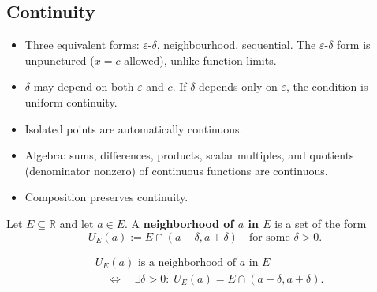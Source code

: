 
\subsection{Continuity}
\label{sec:continuity}


\begin{tcolorbox}[title={Toolkit --- Continuity}]
\begin{itemize}
  \item Three equivalent forms: $\varepsilon$-$\delta$, neighbourhood,
    sequential. The $\varepsilon$-$\delta$ form is unpunctured
    ($x=c$ allowed), unlike function limits.
  \item $\delta$ may depend on both $\varepsilon$ and $c$.
    If $\delta$ depends only on $\varepsilon$, the condition is
    uniform continuity.
  \item Isolated points are automatically continuous.
  \item Algebra: sums, differences, products, scalar multiples,
    and quotients (denominator nonzero) of continuous functions
    are continuous.
  \item Composition preserves continuity.
\end{itemize}
\end{tcolorbox}


\begin{tcolorbox}[title={Definition --- Relative Neighborhood}]
\begin{definition}
\label{def:relative-neighborhood}
Let $E \subseteq \mathbb{R}$ and let $a \in E$. A
\textbf{neighborhood of $a$ in $E$} is a set of the form
\[
U_E(a) := E \cap (a-\delta, a+\delta)
\quad \text{for some } \delta > 0.
\]
\end{definition}
\end{tcolorbox}

\begin{remark*}
\[
\begin{aligned}
&U_E(a) \text{ is a neighborhood of } a \text{ in } E \\
&\quad\Longleftrightarrow\quad
\exists \delta > 0 :\;
U_E(a) = E \cap (a-\delta, a+\delta).
\end{aligned}
\]
\end{remark*}

